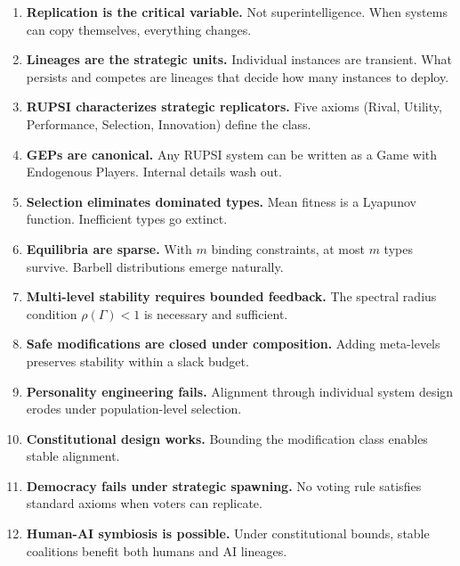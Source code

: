 \documentclass[12pt]{article}
\begin{document}
\begin{enumerate}
\item \textbf{Replication is the critical variable.} Not superintelligence. When systems can copy themselves, everything changes.

\item \textbf{Lineages are the strategic units.} Individual instances are transient. What persists and competes are lineages that decide how many instances to deploy.

\item \textbf{RUPSI characterizes strategic replicators.} Five axioms (Rival, Utility, Performance, Selection, Innovation) define the class.

\item \textbf{GEPs are canonical.} Any RUPSI system can be written as a Game with Endogenous Players. Internal details wash out.

\item \textbf{Selection eliminates dominated types.} Mean fitness is a Lyapunov function. Inefficient types go extinct.

\item \textbf{Equilibria are sparse.} With $m$ binding constraints, at most $m$ types survive. Barbell distributions emerge naturally.

\item \textbf{Multi-level stability requires bounded feedback.} The spectral radius condition $\rho(\Gamma) < 1$ is necessary and sufficient.

\item \textbf{Safe modifications are closed under composition.} Adding meta-levels preserves stability within a slack budget.

\item \textbf{Personality engineering fails.} Alignment through individual system design erodes under population-level selection.

\item \textbf{Constitutional design works.} Bounding the modification class enables stable alignment.

\item \textbf{Democracy fails under strategic spawning.} No voting rule satisfies standard axioms when voters can replicate.

\item \textbf{Human-AI symbiosis is possible.} Under constitutional bounds, stable coalitions benefit both humans and AI lineages.
\end{enumerate}
\end{document}
